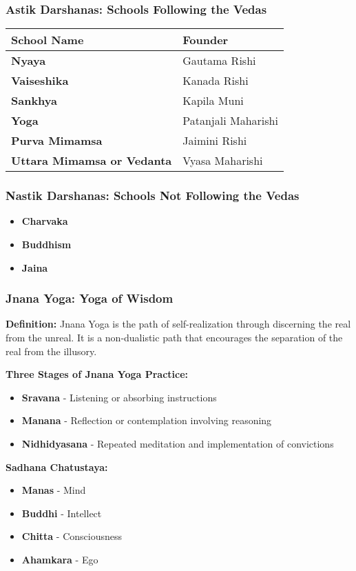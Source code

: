 \begin{frame}[fragile]\frametitle{Astik Darshanas: Schools Following the Vedas}
    \begin{tabular}{|l|l|}
    \hline
    \textbf{School Name} & \textbf{Founder} \\
    \hline
    \textbf{Nyaya} & Gautama Rishi \\
    \hline
    \textbf{Vaiseshika} & Kanada Rishi \\
    \hline
    \textbf{Sankhya} & Kapila Muni \\
    \hline
    \textbf{Yoga} & Patanjali Maharishi \\
    \hline
    \textbf{Purva Mimamsa} & Jaimini Rishi \\
    \hline
    \textbf{Uttara Mimamsa or Vedanta} & Vyasa Maharishi \\
    \hline
    \end{tabular}
\end{frame}

\begin{frame}[fragile]\frametitle{Nastik Darshanas: Schools Not Following the Vedas}
    \begin{itemize}
        \item \textbf{Charvaka}
        \item \textbf{Buddhism}
        \item \textbf{Jaina}
    \end{itemize}
\end{frame}

\begin{frame}[fragile]\frametitle{Jnana Yoga: Yoga of Wisdom}
    \textbf{Definition:} Jnana Yoga is the path of self-realization through discerning the real from the unreal. It is a non-dualistic path that encourages the separation of the real from the illusory.

    
    \textbf{Three Stages of Jnana Yoga Practice:}
    \begin{itemize}
        \item \textbf{Sravana} - Listening or absorbing instructions
        \item \textbf{Manana} - Reflection or contemplation involving reasoning
        \item \textbf{Nidhidyasana} - Repeated meditation and implementation of convictions
    \end{itemize}

    \textbf{Sadhana Chatustaya:}
    \begin{itemize}
        \item \textbf{Manas} - Mind
        \item \textbf{Buddhi} - Intellect
        \item \textbf{Chitta} - Consciousness
        \item \textbf{Ahamkara} - Ego
    \end{itemize}
\end{frame}


